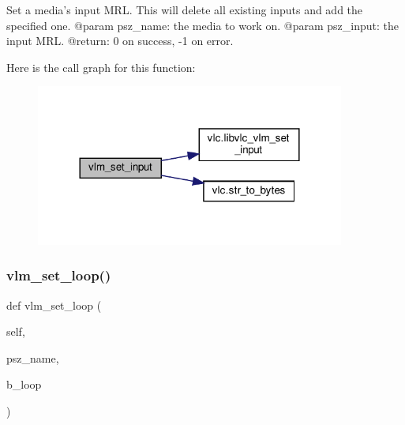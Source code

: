 \begin{DoxyVerb}Set a media's input MRL. This will delete all existing inputs and
add the specified one.
@param psz_name: the media to work on.
@param psz_input: the input MRL.
@return: 0 on success, -1 on error.
\end{DoxyVerb}
 Here is the call graph for this function\+:
\nopagebreak
\begin{figure}[H]
\begin{center}
\leavevmode
\includegraphics[width=288pt]{classvlc_1_1_instance_a45f0affea9ab90df05c660bccba514a5_cgraph}
\end{center}
\end{figure}
\mbox{\label{classvlc_1_1_instance_a8091fb7adc87dd1f5658e7cf0e1ed8b3}} 
\subsubsection{\texorpdfstring{vlm\+\_\+set\+\_\+loop()}{vlm\_set\_loop()}}
{\footnotesize\ttfamily def vlm\+\_\+set\+\_\+loop (\begin{DoxyParamCaption}\item[{}]{self,  }\item[{}]{psz\+\_\+name,  }\item[{}]{b\+\_\+loop }\end{DoxyParamCaption})}

